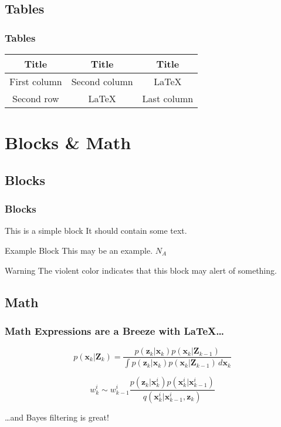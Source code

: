 \documentclass{beamer}
\begin{document}
\subsection{Tables}
\begin{frame}
   \frametitle{Tables}
   \begin{tabular}{|c|c|c|}
      \hline
      \textbf{Title} & \textbf{Title} & \textbf{Title} \\
      \hline
      First column & Second column &  \LaTeX  \\
      \hline
      Second row & \LaTeX & Last column \\
      \hline
   \end{tabular}
\end{frame}



\section{Blocks \& Math}
\subsection{Blocks}
\begin{frame}
   \frametitle{Blocks}

   \begin{block}{This is a simple block}
      It should contain some text.
   \end{block}

   \begin{exampleblock}{Example Block}
      This may be an example.
      $N_A$
   \end{exampleblock}


   \begin{alertblock}{Warning}
      The violent color indicates that this block may alert of something.
   \end{alertblock}
\end{frame}



\subsection{Math} 
\begin{frame}
   \frametitle{Math Expressions are a Breeze with \LaTeX \ldots}

   \begin{equation}
      p(\mathbf{x}_{k}|\mathbf{Z}_{k}) = \frac{p(\mathbf{z}_{k}|\mathbf{x     }_{k})p(\mathbf{x}_{k}|\mathbf{Z}_{k-1})}{\int \! p(\mathbf{z}_{k}|\mathbf{     x}_{k})p(\mathbf{x}_{k}|\mathbf{Z}_{k-1})\,d\mathbf{x}_{k}}
   \end{equation}

   \begin{equation}
      w_{k}^{i} \sim w_{k-1}^{i}\frac{p(\mathbf{z}_{k}|\mathbf{x}_{k}^{i})p(\mathbf{x}_{k}^{i}|\mathbf{x}_{k-1}^{i})}{q(\mathbf{x}_{k}^{i}|\mathbf{x}_{k-1}^{i},\mathbf{z}_{k})}
   \end{equation}

   \ldots and Bayes filtering is great!

\end{frame}
\end{document}
